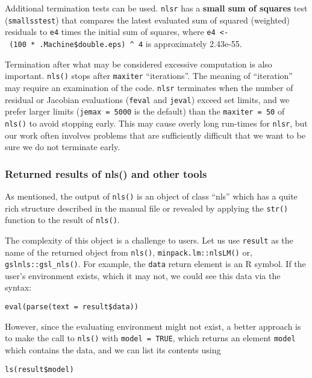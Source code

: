 Additional termination tests can be used. \texttt{nlsr} has a \textbf{small sum of
squares} test (\texttt{smallsstest}) that compares the latest evaluated sum of squared
(weighted) residuals to \texttt{e4} times the initial sum of squares, where
\texttt{e4\ \textless{}-\ (100\ *\ .Machine\$double.eps)\ \^{}\ 4} is approximately 2.43e-55.

Termination after what may be considered excessive computation is also important.
\texttt{nls()} stops after \texttt{maxiter} ``iterations''. The meaning of ``iteration'' may require an
examination of the code. \texttt{nlsr} terminates when the number of residual or
Jacobian evaluations (\texttt{feval} and \texttt{jeval}) exceed set limits, and we prefer larger
limits (\texttt{jemax\ =\ 5000} is the default) than the \texttt{maxiter\ =\ 50} of \texttt{nls()} to avoid
stopping early. This may cause overly long run-times for \texttt{nlsr}, but our work often
involves problems that are sufficiently difficult that we want to be sure we do not
terminate early.

\hypertarget{returned-results-of-nls-and-other-tools}{%
\subsubsection{Returned results of nls() and other tools}\label{returned-results-of-nls-and-other-tools}}

As mentioned, the output of \texttt{nls()} is an object of class ``nls'' which has a quite
rich structure described in the manual file or revealed by applying the \texttt{str()}
function to the result of \texttt{nls()}.

The complexity of this object is a challenge to users. Let us use
\texttt{result} as the name of the returned object from \texttt{nls()}, \texttt{minpack.lm::nlsLM()} or,
\texttt{gslnls::gsl\_nls()}. For example, the \texttt{data} return element is an R symbol.
If the user's environment exists, which it may not, we could see this data
via the syntax:

\begin{verbatim}
eval(parse(text = result$data))
\end{verbatim}

However, since the evaluating environment might not exist, a better approach
is to make the call to \texttt{nls()}
with \texttt{model\ =\ TRUE}, which returns an element
\texttt{model} which contains the data, and we can list its contents using

\begin{verbatim}
ls(result$model)
\end{verbatim}

